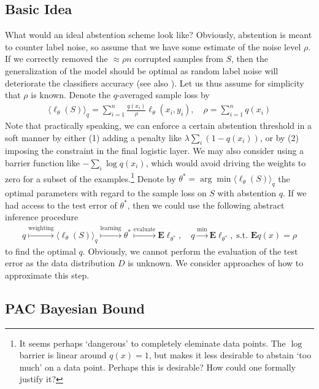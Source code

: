 \documentclass[12pt,a4paper]{article}
\begin{document}
\subsection{Basic Idea} 
What would an ideal abstention scheme look like? Obviously, abstention is meant to counter label noise, so assume that we have some estimate of the noise level $\rho$. If we correctly removed the $\approx \rho n$ corrupted samples from $S$, then the generalization of the model should be optimal as random label noise will deteriorate the classifiers accuracy (see also \cite{zhang2016understanding}). Let us thus assume for simplicity that $\rho$ is known. Denote the $q$-averaged sample loss by 
\begin{align}
\langle \ell_\theta(S) \rangle_q = \sum_{i=1}^n \frac{q(x_i)}{\rho} \ell_\theta(x_i,y_i), \quad \rho = \sum_{i=1}^n q(x_i)
\end{align}
Note that practically speaking, we can enforce a certain abstention threshold in a soft manner by either (1) adding a penalty like $\lambda \sum_i (1-q(x_i))$, or by (2) imposing the constraint in the final logistic layer. We may also consider using a barrier function like $-\sum_i \log q(x_i)$, which would avoid driving the weights to zero for a subset of the examples.\footnote{It seems perhaps `dangerous' to completely eleminate data points. The $\log$ barrier is linear around $q(x)=1$, but makes it less desirable to abstain `too much' on a data point. Perhaps this is desirable? How could one formally justify it?} Denote by $\theta^* = \arg\min \langle \ell_\theta(S) \rangle_q$ the optimal parameters with regard to the sample loss on $S$ with abstention $q$.  If we had access to the test error of $\theta^*$, then we could use the following abstract inference procedure 
\begin{align}
q \stackrel{\text{weighting}}\mapsto \langle \ell_\theta(S) \rangle_q \stackrel{\text{learning}} \mapsto \theta^* \stackrel{\text{evaluate}}\mapsto \mathbf E\ell_{\theta^*}, \quad q \stackrel \min \longrightarrow \mathbf E\ell_{\theta^*}, \; \text{s.t. }\mathbf E q(x) = \rho
\end{align}
to find the optimal $q$. Obviously, we cannot perform the evaluation of the test error as the data distribution $D$ is unknown. We consider approaches of how to approximate this step.  


\subsection{PAC Bayesian Bound}
\end{document}
